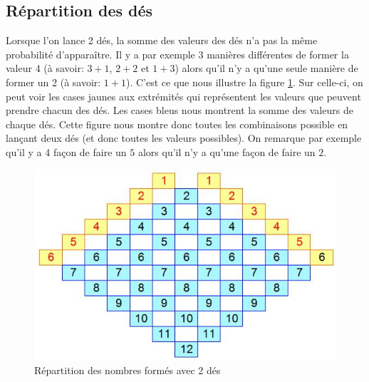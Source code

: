 \documentclass[letterpaper]{article}
\begin{document}
  \subsection{Répartition des dés}
    \label{repart_des}
    Lorsque l'on lance 2 dés, la somme des valeurs des dés n'a pas la même probabilité
    d'apparaître.  Il y a par exemple 3 manières différentes de former la valeur 4 (à 
    savoir: $3+1$, $2+2$ et $1+3$) alors qu'il n'y a qu'une seule manière de former 
    un 2 (à savoir: $1+1$).
    C'est ce que nous illustre la figure \ref{tableau_repartition_des}.  Sur celle-ci,
    on peut voir les cases jaunes aux extrémités qui représentent les valeurs que 
    peuvent prendre chacun des dés.  Les cases bleus nous montrent la somme des valeurs
    de chaque dés.  Cette figure nous montre donc toutes les combinaisons possible en
    lançant deux dés (et donc toutes les valeurs possibles).  On remarque par exemple
    qu'il y a 4 façon de faire un $5$ alors qu'il n'y a qu'une façon de faire un $2$.
    \begin{figure}[h]
      \centering
      \includegraphics[scale=0.4]{./Images/RepartitionDes.jpg}
	\caption{Répartition des nombres formés avec 2 dés \citep{IMG_Des}}
      \label{tableau_repartition_des}
    \end{figure}
    
\end{document}
